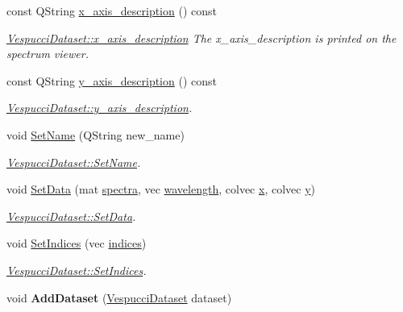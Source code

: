 \begin{DoxyCompactItemize}
\item 
const Q\+String \hyperlink{class_vespucci_dataset_a7fb9e44d71e9e874eab1f5daaef86a5a}{x\+\_\+axis\+\_\+description} () const 
\begin{DoxyCompactList}\small\item\em \hyperlink{class_vespucci_dataset_a7fb9e44d71e9e874eab1f5daaef86a5a}{Vespucci\+Dataset\+::x\+\_\+axis\+\_\+description} The x\+\_\+axis\+\_\+description is printed on the spectrum viewer. \end{DoxyCompactList}\item 
const Q\+String \hyperlink{class_vespucci_dataset_a997026da2bb3693568f62e156f9a5e49}{y\+\_\+axis\+\_\+description} () const 
\begin{DoxyCompactList}\small\item\em \hyperlink{class_vespucci_dataset_a997026da2bb3693568f62e156f9a5e49}{Vespucci\+Dataset\+::y\+\_\+axis\+\_\+description}. \end{DoxyCompactList}\item 
void \hyperlink{class_vespucci_dataset_aa35196b0c4fb0617d7ffd9545b9119b3}{Set\+Name} (Q\+String new\+\_\+name)
\begin{DoxyCompactList}\small\item\em \hyperlink{class_vespucci_dataset_aa35196b0c4fb0617d7ffd9545b9119b3}{Vespucci\+Dataset\+::\+Set\+Name}. \end{DoxyCompactList}\item 
void \hyperlink{class_vespucci_dataset_a6deccc4fb8829e27a68289e07a294f90}{Set\+Data} (mat \hyperlink{class_vespucci_dataset_ac100f2f4f228ce57b3359a64ed585217}{spectra}, vec \hyperlink{class_vespucci_dataset_ad2ea4fcac54bae36565fde6c95177eee}{wavelength}, colvec \hyperlink{class_vespucci_dataset_add055b3b17436184f1712d8e28904250}{x}, colvec \hyperlink{class_vespucci_dataset_a78181bbf489bf4e98fb4772ca6ae012e}{y})
\begin{DoxyCompactList}\small\item\em \hyperlink{class_vespucci_dataset_a6deccc4fb8829e27a68289e07a294f90}{Vespucci\+Dataset\+::\+Set\+Data}. \end{DoxyCompactList}\item 
void \hyperlink{class_vespucci_dataset_ac3d023864da930929b3491ef0d4ec14b}{Set\+Indices} (vec \hyperlink{class_vespucci_dataset_ace7fb38d007d7fdd3c64be5174ae00f8}{indices})
\begin{DoxyCompactList}\small\item\em \hyperlink{class_vespucci_dataset_ac3d023864da930929b3491ef0d4ec14b}{Vespucci\+Dataset\+::\+Set\+Indices}. \end{DoxyCompactList}\item 
void {\bfseries Add\+Dataset} (\hyperlink{class_vespucci_dataset}{Vespucci\+Dataset} dataset)\hypertarget{class_vespucci_dataset_a1d728faac400905bef4fa437e089c987}{}\label{class_vespucci_dataset_a1d728faac400905bef4fa437e089c987}


\end{DoxyCompactItemize}
